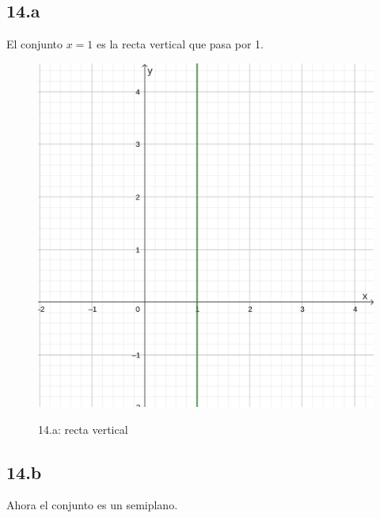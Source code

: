 \documentclass{article}
\begin{document}
\subsection*{14.a}
\label{subsec:14.a}

El conjunto $x = 1$ es la recta vertical que pasa por 1.

\begin{figure}[ht]
\caption{14.a: recta vertical}
\includegraphics[scale=1]{../../common/sb_28/ex_00/ex_14a.png} 
\centering
\label{fig:14a}
\end{figure}

\subsection*{14.b}
\label{subsec:14.b}

Ahora el conjunto es un semiplano.
\end{document}
